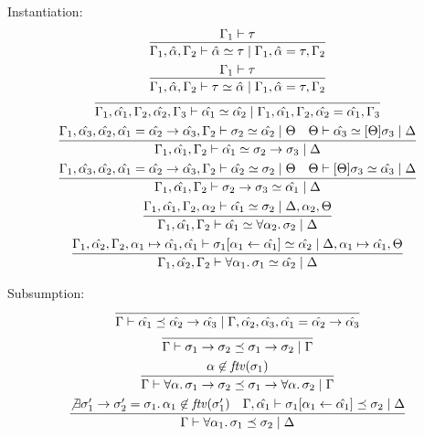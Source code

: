 Instantiation:
\begin{gather*}
  \infer{\Gamma_1, \hat{\alpha}, \Gamma_2 \vdash \hat{\alpha} \simeq \tau \mid \Gamma_1, \hat{\alpha} = \tau, \Gamma_2}{
    \Gamma_1 \vdash \tau
  }
  \\
  \infer{\Gamma_1, \hat{\alpha}, \Gamma_2 \vdash \tau \simeq \hat{\alpha} \mid \Gamma_1, \hat{\alpha} = \tau, \Gamma_2}{
    \Gamma_1 \vdash \tau
  }
  \\
  \infer{\Gamma_1, \hat{\alpha_1}, \Gamma_2, \hat{\alpha_2}, \Gamma_3 \vdash \hat{\alpha_1} \simeq \hat{\alpha_2} \mid \Gamma_1, \hat{\alpha_1}, \Gamma_2, \hat{\alpha_2} = \hat{\alpha_1}, \Gamma_3}{}
  \\
  \infer{\Gamma_1, \hat{\alpha_1}, \Gamma_2 \vdash \hat{\alpha_1} \simeq \sigma_2 \to \sigma_3 \mid \Delta}{
    \Gamma_1, \hat{\alpha_3}, \hat{\alpha_2}, \hat{\alpha_1} = \hat{\alpha_2} \to \hat{\alpha_3}, \Gamma_2 \vdash \sigma_2 \simeq \hat{\alpha_2} \mid \Theta
    &
    \Theta \vdash \hat{\alpha_3} \simeq [\Theta]\sigma_3 \mid \Delta
  }
  \\
  \infer{\Gamma_1, \hat{\alpha_1}, \Gamma_2 \vdash \sigma_2 \to \sigma_3 \simeq \hat{\alpha_1} \mid \Delta}{
    \Gamma_1, \hat{\alpha_3}, \hat{\alpha_2}, \hat{\alpha_1} = \hat{\alpha_2} \to \hat{\alpha_3}, \Gamma_2 \vdash \hat{\alpha_2} \simeq \sigma_2 \mid \Theta
    &
    \Theta \vdash [\Theta]\sigma_3 \simeq \hat{\alpha_3} \mid \Delta
  }
  \\
  \infer{\Gamma_1, \hat{\alpha_1}, \Gamma_2 \vdash \hat{\alpha_1} \simeq \forall \alpha_2\ldotp \sigma_2 \mid \Delta}{
    \Gamma_1, \hat{\alpha_1}, \Gamma_2, \alpha_2 \vdash \hat{\alpha_1} \simeq \sigma_2 \mid \Delta, \alpha_2, \Theta
  }
  \\
  \infer{\Gamma_1, \hat{\alpha_2}, \Gamma_2 \vdash \forall \alpha_1\ldotp \sigma_1 \simeq \hat{\alpha_2} \mid \Delta}{
    \Gamma_1, \hat{\alpha_2}, \Gamma_2, \alpha_1 \mapsto \hat{\alpha_1}, \hat{\alpha_1} \vdash \sigma_1[\alpha_1 \assign \hat{\alpha_1}] \simeq \hat{\alpha_2} \mid \Delta, \alpha_1 \mapsto \hat{\alpha_1}, \Theta
  }
\end{gather*}

Subsumption:
\begin{gather*}
  \infer{\Gamma \vdash \hat{\alpha_1} \preceq \hat{\alpha_2} \to \hat{\alpha_3} \mid \Gamma, \hat{\alpha_2}, \hat{\alpha_3}, \hat{\alpha_1} = \hat{\alpha_2} \to \hat{\alpha_3}}{}
  \\
  \infer{\Gamma \vdash \sigma_1 \to \sigma_2 \preceq \sigma_1 \to \sigma_2 \mid \Gamma}{}
  \\
  \infer{\Gamma \vdash \forall \alpha\ldotp \sigma_1 \to \sigma_2 \preceq \sigma_1 \to \forall \alpha\ldotp \sigma_2 \mid \Gamma}{
    \alpha \not\in \mathit{ftv}(\sigma_1)
  }
  \\
  \infer{\Gamma \vdash \forall \alpha_1\ldotp \sigma_1 \preceq \sigma_2 \mid \Delta}{
    \not\exists \sigma'_1 \to \sigma'_2 = \sigma_1\ldotp \alpha_1 \not\in \mathit{ftv}(\sigma'_1)
    &
    \Gamma, \hat{\alpha_1} \vdash \sigma_1[\alpha_1 \assign \hat{\alpha_1}] \preceq \sigma_2 \mid \Delta
  }
\end{gather*}
